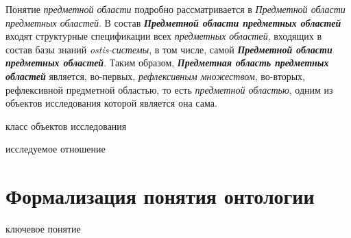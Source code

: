 Понятие \textit{предметной области} подробно рассматривается в \textit{Предметной области предметных областей}. В состав \textbf{\textit{Предметной области предметных областей}} входят структурные спецификации всех \textit{предметных областей}, входящих в состав базы знаний \textit{ostis-системы}, в том числе, самой \textbf{\textit{Предметной области предметных областей}}. Таким образом, \textbf{\textit{Предметная область предметных областей}} является, во-первых, \textit{рефлексивным множеством}, во-вторых, рефлексивной предметной областью, то есть \textit{предметной областью}, одним из объектов исследования которой является она сама.

\begin{SCn}
	\begin{scnhaselementrolelist}{класс объектов исследования}
	\end{scnhaselementrolelist}
	\begin{scnhaselementrolelist}{исследуемое отношение}
	\end{scnhaselementrolelist}
\end{SCn}

\section{Формализация понятия онтологии}
\label{sec_ontology}

\begin{SCn}
	\begin{scnrelfromlist}{ключевое понятие}
	\end{scnrelfromlist}
\end{SCn}

